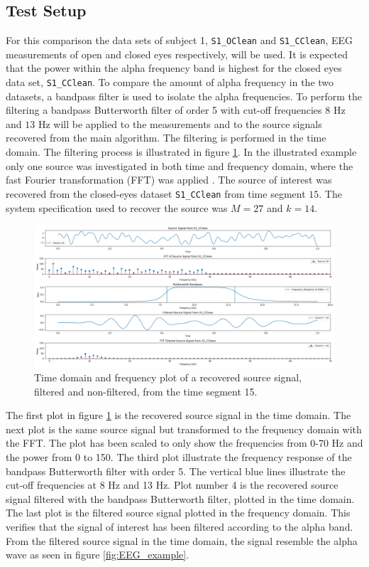 \subsection{Test Setup}
For this comparison the data sets of subject 1, \texttt{S1\_OClean} and \texttt{S1\_CClean}, EEG measurements of open and closed eyes respectively, will be used. 
It is expected that the power within the alpha frequency band is highest for the closed eyes data set, \texttt{S1\_CClean}.
To compare the amount of alpha frequency in the two datasets, a bandpass filter is used to isolate the alpha frequencies. 
To perform the filtering a bandpass Butterworth filter of order 5 with cut-off frequencies $8$ Hz and $13$ Hz will be applied to the measurements and to the source signals recovered from the main algorithm. The filtering is performed in the time domain. 
The filtering process is illustrated in figure \ref{fig:dft_1}.
In the illustrated example only one source was investigated in both time and frequency domain, where the fast Fourier transformation (FFT) was applied \cite[Chapter 9]{FFT}. The source of interest was recovered from the closed-eyes dataset \texttt{S1\_CClean} from time segment $15$. The system specification used to recover the source was $M=27$ and $k=14$.
\begin{figure}[H]
\centering
\includegraphics[scale=0.28]{figures/ch_7/DFT_plot_X_timeseg15_source10.png}
\caption{Time domain and frequency plot of a recovered source signal, filtered and non-filtered, from the time segment 15.}
\label{fig:dft_1}
\end{figure}
\noindent
The first plot in figure \ref{fig:dft_1} is the recovered source signal in the time domain. The next plot is the same source signal but transformed to the frequency domain with the FFT. The plot has been scaled to only show the frequencies from 0-70 Hz and the power from 0 to 150. The third plot illustrate the frequency response of the bandpass Butterworth filter with order 5. The vertical blue lines illustrate the cut-off frequencies at 8 Hz and 13 Hz.
Plot number 4 is the recovered source signal filtered with the bandpass Butterworth filter, plotted in the time domain. The last plot is the filtered source signal plotted in the frequency domain. This verifies that the signal of interest has been filtered according to the alpha band. From the filtered source signal in the time domain, the signal resemble the alpha wave as seen in figure \ref{fig:EEG_example}.

